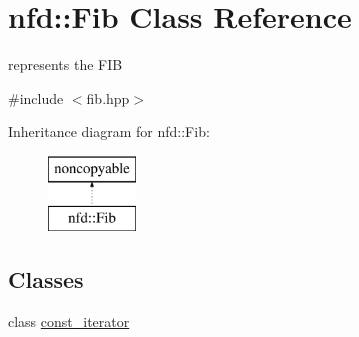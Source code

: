 \hypertarget{classnfd_1_1Fib}{}\section{nfd\+:\+:Fib Class Reference}
\label{classnfd_1_1Fib}


represents the F\+IB  




{\ttfamily \#include $<$fib.\+hpp$>$}

Inheritance diagram for nfd\+:\+:Fib\+:\begin{figure}[H]
\begin{center}
\leavevmode
\includegraphics[height=2.000000cm]{classnfd_1_1Fib}
\end{center}
\end{figure}
\subsection*{Classes}
\begin{DoxyCompactItemize}
\item 
class \hyperlink{classnfd_1_1Fib_1_1const__iterator}{const\+\_\+iterator}
\end{DoxyCompactItemize}

